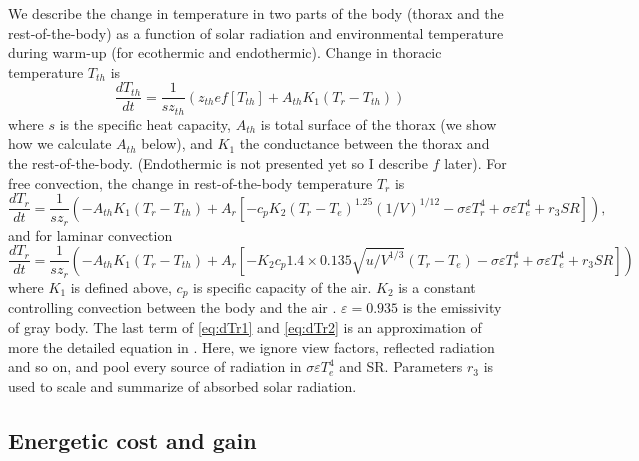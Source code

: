 We describe the change in temperature in two parts of the body (thorax and the rest-of-the-body) as a function of solar radiation and environmental temperature during warm-up (for ecothermic and endothermic). 
Change in thoracic temperature $T_{th}$ is 
\begin{equation} \label{eq:dTh}
	\frac{dT_{th}}{dt} = \frac{1}{s z_{th}} (z_{th} e f[T_{th}] +  A_{th} K_1(T_r - T_{th}))
\end{equation}
where $s$ is the specific heat capacity, $A_{th}$ is total surface of the thorax (we show how we calculate $A_{th}$ below), and $K_1$ the conductance between the thorax and the rest-of-the-body.
(Endothermic is not presented yet so I describe $f$ later).
For free convection, the change in rest-of-the-body temperature $T_r$ is
\begin{equation} \label{eq:dTr1}
	\frac{dT_{r}}{dt} = \frac{1}{s z_{r}} \left( - A_{th} K_1(T_r - T_{th}) + A_r \left[ - c_p K_2 (T_r- T_e)^{1.25} (1/V)^{1/12}- \sigma \varepsilon T_r^4 + \sigma \varepsilon T_e^4  + r_3 SR  \right] \right),
\end{equation}
and for laminar convection
\begin{equation} \label{eq:dTr2}
	\frac{dT_{r}}{dt} = \frac{1}{s z_{r}} \left( - A_{th} K_1(T_r - T_{th}) + A_r \left[ - K_2 c_p  1.4 \times 0.135 \sqrt{u/V^{1/3}} (T_r- T_e) - \sigma \varepsilon T_r^4 + \sigma \varepsilon T_e^4  + r_3 SR  \right] \right)
\end{equation}
where $K_1$ is defined above, $c_p$ is specific capacity of the air. 
$K_2$ is a constant controlling convection between the body and the air \citep{Campbell2012}.
$\varepsilon = 0.935$  is the emissivity of gray body.
The last term of \cref{eq:dTr1} and \cref{eq:dTr2} is an approximation of more the detailed equation in \citet{Campbell2012}.
Here, we ignore view factors, reflected radiation and so on, and pool every source of radiation in $ \sigma \varepsilon T_e^4$ and SR. 
Parameters $r_3$ is used to scale and summarize of absorbed solar radiation.


\subsection*{Energetic cost and gain}
